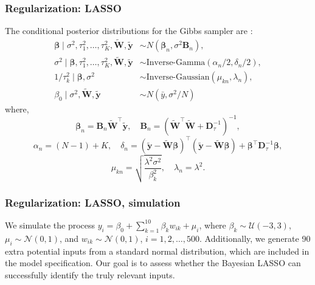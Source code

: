 \documentclass[12pt, compress]{beamer}
\begin{document}
\begin{frame}
	\frametitle{Regularization: LASSO}
The conditional posterior distributions for the Gibbs sampler are \citep{Park2008}:
\begin{align*}
	\boldsymbol{\beta} \mid \sigma^2, \tau_1^2, \dots, \tau_K^2, \tilde{\mathbf{W}}, \tilde{\mathbf{y}} &\sim {N}(\boldsymbol{\beta}_n, \sigma^2 \mathbf{B}_n), \\
	\sigma^2 \mid \boldsymbol{\beta}, \tau_1^2, \dots, \tau_K^2, \tilde{\mathbf{W}}, \tilde{\mathbf{y}} &\sim \text{Inverse-Gamma}(\alpha_n/2, \delta_n/2), \\
	1/\tau_k^2 \mid \boldsymbol{\beta}, \sigma^2 &\sim \text{Inverse-Gaussian}(\mu_{kn}, \lambda_n),\\
	\beta_0\mid \sigma^2, \tilde{\mathbf{W}}, \tilde{\mathbf{y}} &\sim N(\bar{y},\sigma^2/N) 
\end{align*}
where,
\[\boldsymbol{\beta}_n = \mathbf{B}_n \tilde{\mathbf{W}}^{\top} \tilde{\mathbf{y}}, \quad	\mathbf{B}_n= \left( \tilde{\mathbf{W}}^{\top} \tilde{\mathbf{W}} + \mathbf{D}_{\tau}^{-1} \right)^{-1},\]
\[\alpha_n = (N - 1) + K, \quad \delta_n = (\tilde{\mathbf{y}} - \tilde{\mathbf{W}} \boldsymbol{\beta})^{\top} (\tilde{\mathbf{y}} - \tilde{\mathbf{W}} \boldsymbol{\beta}) + \boldsymbol{\beta}^{\top} \mathbf{D}_{\tau}^{-1} \boldsymbol{\beta},\]
\[\mu_{kn} = \sqrt{ \frac{ \lambda^2 \sigma^2 }{ \beta_k^2 } }, \quad \lambda_n = \lambda^2.\]
\end{frame}


\begin{frame}
	\frametitle{Regularization: LASSO, simulation}
We simulate the process \( y_i = \beta_0 + \sum_{k=1}^{10} \beta_k w_{ik}  + \mu_i \), where \( \beta_k \sim \mathcal{U}(-3, 3) \), \( \mu_i \sim \mathcal{N}(0, 1) \), and \( w_{ik} \sim \mathcal{N}(0, 1) \), $i=1,2,\dots,500$. Additionally, we generate 90 extra potential inputs from a standard normal distribution, which are included in the model specification. Our goal is to assess whether the Bayesian LASSO can successfully identify the truly relevant inputs.
\end{frame}
\end{document}
